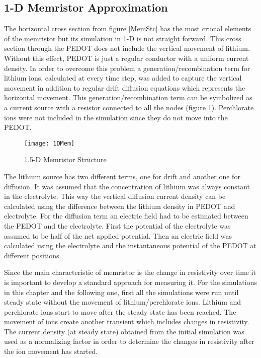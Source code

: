 \begin{doublespace}
\clearpage
\section{1-D Memristor Approximation}

The horizontal cross section from figure \ref{MemStc} has the most crucial elements of the memristor but its simulation in 1-D is not straight forward. This cross section through the PEDOT does not include the vertical movement of lithium. Without this effect, PEDOT is just a regular conductor with a uniform current density. In order to overcome this problem a generation/recombination term for lithium ions, calculated at every time step, was added to capture the vertical movement in addition to regular drift diffusion equations which represents the horizontal movement. This generation/recombination term can be symbolized as a current source with a resistor connected to all the nodes (figure \ref{MemStc15}). Perchlorate ions were not included in the simulation since they do not move into the PEDOT.

\begin{figure}[!htp]
\centering
\texttt{[image: 1DMem]}
\caption{1.5-D Memristor Structure} 
\label{MemStc15}
\end{figure}

The lithium source has two different terms, one for drift and another one for diffusion. It was assumed that the concentration of lithium was always constant in the electrolyte. This way the vertical diffusion current density can be calculated using the difference between the lithium density in PEDOT and electrolyte. For the diffusion term an electric field had to be estimated between the PEDOT and the electrolyte. First the potential of the electrolyte was assumed to be half of the net applied potential. Then an electric field was calculated using the electrolyte and the instantaneous potential of the PEDOT at different positions.

Since the main characteristic of memristor is the change in resistivity over time it is important to develop a standard approach for measuring it. For the simulations in this chapter and the following one, first all the simulations were run until steady state without the movement of lithium/perchlorate ions. Lithium and perchlorate ions start to move after the steady state has been reached. The movement of ions create another transient which includes changes in resistivity. The current density (at steady state) obtained from the initial simulation was used as a normalizing factor in order to determine the changes in resistivity after the ion movement has started.


\end{doublespace}
